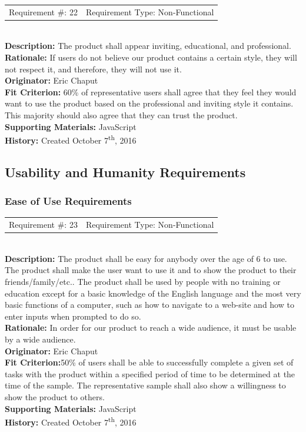 \documentclass[12pt, titlepage]{article}
\begin{document}
\begin{reqbox}
%
\begin{tabular}{cc}
Requirement \#: 22 & Requirement Type: Non-Functional \\
\end{tabular} \\
%
\textbf{Description:} The product shall appear inviting, educational, and professional. \\
\textbf{Rationale:}  If users do not believe our product contains a certain style, they will not respect it, and therefore, they will not use it.\\
\textbf{Originator:} Eric Chaput\\
\textbf{Fit Criterion:} 60\% of representative users shall agree that they feel they would want to use the product based on the professional and inviting style it contains. This majority should also agree that they can trust the product.\\
%  
\textbf{Supporting Materials:} JavaScript \\
\textbf{History:} Created October 7\textsuperscript{th}, 2016
%
\end{reqbox}

\subsection{Usability and Humanity Requirements}

\subsubsection{Ease of Use Requirements}
\begin{reqbox}
%
\begin{tabular}{cc}
Requirement \#: 23 & Requirement Type: Non-Functional \\
\end{tabular} \\
%
\textbf{Description:} The product shall be easy for anybody over the age of 6 to use. The product shall make the user want to use it and to show the product to 
their friends/family/etc.. The product shall be used by people with no training 
or education except for a basic knowledge of the English language and the most 
very basic functions of a computer, such as how to navigate to a web-site and 
how to enter inputs when prompted to do so. \\
\textbf{Rationale:}  In order for our product to reach a wide audience, it must be usable by a wide audience.\\
\textbf{Originator:} Eric Chaput\\
\textbf{Fit Criterion:}50\% of users 
shall be able to successfully complete a given set of tasks with the product 
within a specified period of time to be determined at the time of the sample. 
The representative sample shall also show a willingness to show the product to 
others.\\
%  
\textbf{Supporting Materials:} JavaScript \\
\textbf{History:} Created October 7\textsuperscript{th}, 2016
%
\end{reqbox}
\end{document}
